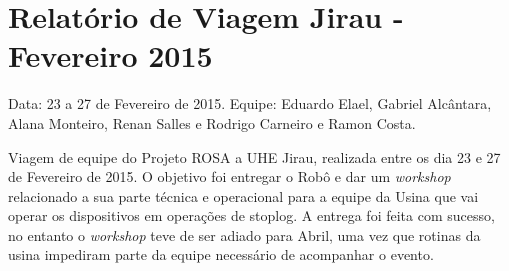 \section{Relatório de Viagem Jirau - Fevereiro 2015}
Data: 23 a 27 de Fevereiro de 2015.
Equipe: Eduardo Elael, Gabriel Alcântara, Alana Monteiro, Renan Salles e Rodrigo Carneiro e Ramon Costa.


Viagem de equipe do Projeto ROSA a UHE Jirau, realizada entre
os dia 23 e 27 de Fevereiro de 2015. O objetivo foi entregar o Robô e dar um
\textit{workshop} relacionado a sua parte técnica e operacional para a equipe da
Usina que vai operar os dispositivos em operações de stoplog. A entrega foi
feita com sucesso, no entanto o \textit{workshop} teve de ser adiado para Abril, uma vez que
rotinas da usina impediram parte da equipe necessário de acompanhar o evento.
